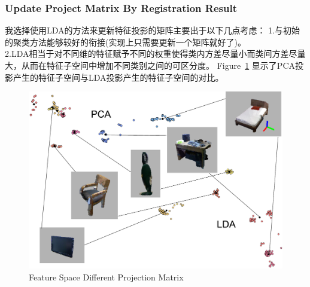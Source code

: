 \subsubsection{Update Project Matrix By Registration Result}
我选择使用LDA的方法来更新特征投影的矩阵主要出于以下几点考虑：
1.与初始的聚类方法能够较好的衔接(实现上只需要更新一个矩阵就好了)。\\
2.LDA相当于对不同维的特征赋予不同的权重使得类内方差尽量小而类间方差尽量大，从而在特征子空间中增加不同类别之间的可区分度。
Figure~\ref{fig:bedroom_pca_lda} 显示了PCA投影产生的特征子空间与LDA投影产生的特征子空间的对比。
\begin{figure}
	\centering
	\includegraphics[width=2\columnwidth]{figures/hsy/bedroom_feature_compare}
	\caption{Feature Space Different Projection Matrix}
	\label{fig:bedroom_pca_lda}
\end{figure}
